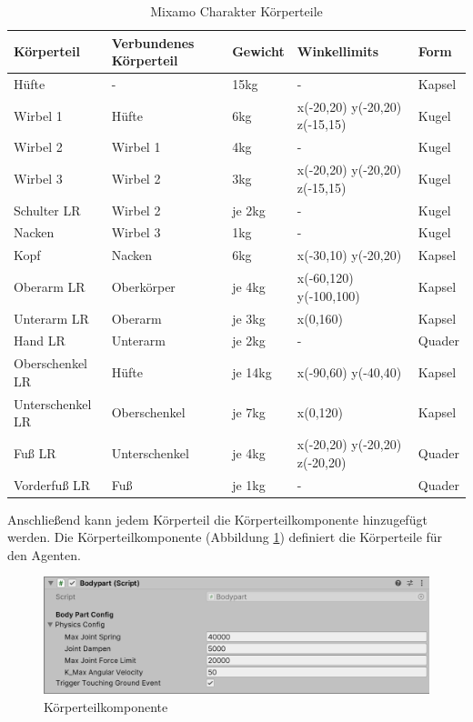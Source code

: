\begin{table}[H]
  \centering
  {
  \begin{tabular}{ |p{3cm}|p{3cm}|p{2cm}|p{4cm}|p{2cm}| }
  \hline
  \textbf{Körpertei}l& \textbf{Verbundenes Körperteil} & \textbf{Gewicht} & \textbf{Winkellimits} & \textbf{Form} \\
  \hline
  Hüfte & - & 15kg & - & Kapsel \\
  \hline
  Wirbel 1 & Hüfte & 6kg & x(-20,20) y(-20,20) z(-15,15) & Kugel \\
  \hline
  Wirbel 2 & Wirbel 1 & 4kg & - & Kugel \\
  \hline
  Wirbel 3 & Wirbel 2 & 3kg & x(-20,20) y(-20,20) z(-15,15) & Kugel \\
  \hline
  Schulter LR & Wirbel 2 & je 2kg& - & Kugel \\
  \hline
  Nacken & Wirbel 3 & 1kg & - & Kugel \\
  \hline
  Kopf & Nacken & 6kg & x(-30,10) y(-20,20) & Kapsel \\
  \hline
  Oberarm LR & Oberkörper & je 4kg & x(-60,120) y(-100,100) & Kapsel \\
  \hline
  Unterarm LR & Oberarm & je 3kg & x(0,160) & Kapsel \\
  \hline
  Hand LR & Unterarm & je 2kg & - & Quader \\
  \hline
  Oberschenkel LR & Hüfte & je 14kg& x(-90,60) y(-40,40) & Kapsel \\
  \hline
  Unterschenkel LR & Oberschenkel & je 7kg &  x(0,120) & Kapsel \\
  \hline
  Fuß LR & Unterschenkel & je 4kg & x(-20,20) y(-20,20) z(-20,20) & Quader \\
  \hline
  Vorderfuß LR & Fuß & je 1kg & - & Quader \\
  \hline
  \end{tabular}}
  \caption{Mixamo Charakter Körperteile}
  \label{table:mixamo_körperteile}
\end{table}

Anschließend kann jedem Körperteil die Körperteilkomponente hinzugefügt werden. Die Körperteilkomponente (Abbildung \ref{fig:komponente_bodypart}) definiert die Körperteile für den Agenten.
\begin{figure}[H]
  \centering  
  \includegraphics[scale=0.5]{img/komponente_bodypart}
  \caption{Körperteilkomponente}
  \label{fig:komponente_bodypart}
\end{figure}

